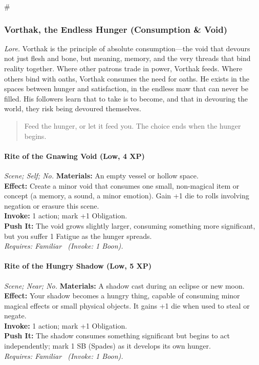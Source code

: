 # %

\subsubsection{Vorthak, the Endless Hunger (Consumption \& Void)}
\textit{Lore.} Vorthak is the principle of absolute consumption—the void that devours not just flesh and bone, but meaning, memory, and the very threads that bind reality together. Where other patrons trade in power, Vorthak feeds. Where others bind with oaths, Vorthak consumes the need for oaths. He exists in the spaces between hunger and satisfaction, in the endless maw that can never be filled. His followers learn that to take is to become, and that in devouring the world, they risk being devoured themselves.

\begin{quote}
Feed the hunger, or let it feed you. The choice ends when the hunger begins.
\end{quote}

\paragraph*{Rite of the Gnawing Void (Low, 4 XP)} \emph{Scene; Self; No.}
\textbf{Materials:} An empty vessel or hollow space.\\
\textbf{Effect:} Create a minor void that consumes one small, non-magical item or concept (a memory, a sound, a minor emotion). Gain +1 die to rolls involving negation or erasure this scene.\\
\textbf{Invoke:} 1 action; mark +1 Obligation.\\
\textbf{Push It:} The void grows slightly larger, consuming something more significant, but you suffer 1 Fatigue as the hunger spreads.\\
\emph{Requires: Familiar \ (\textit{Invoke:} 1 Boon).}

\paragraph*{Rite of the Hungry Shadow (Low, 5 XP)} \emph{Scene; Near; No.}
\textbf{Materials:} A shadow cast during an eclipse or new moon.\\
\textbf{Effect:} Your shadow becomes a hungry thing, capable of consuming minor magical effects or small physical objects. It gains +1 die when used to steal or negate.\\
\textbf{Invoke:} 1 action; mark +1 Obligation.\\
\textbf{Push It:} The shadow consumes something significant but begins to act independently; mark 1 SB (Spades) as it develops its own hunger.\\
\emph{Requires: Familiar \ (\textit{Invoke:} 1 Boon).}

